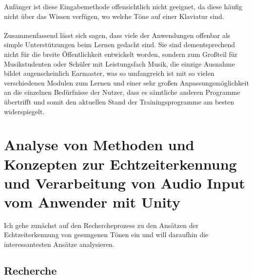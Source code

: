 Anfänger ist diese Eingabemethode offensichtlich nicht geeignet, da diese häufig nicht über das Wissen verfügen, wo welche Töne auf einer Klaviatur sind. \\\\
Zusammenfassend lässt sich sagen, dass viele der Anwendungen offenbar als simple Unterstützungen beim Lernen gedacht sind. Sie sind dementsprechend nicht für die breite Öffentlichkeit entwickelt worden, sondern zum Großteil für Musikstudenten oder Schüler mit Leistungsfach Musik, die einzige Ausnahme bildet augenscheinlich Earmaster, was so umfangreich ist mit so vielen verschiedenen Modulen zum Lernen und einer sehr großen Anpassungsmöglichkeit an die einzelnen Bedürfnisse der Nutzer, dass es sämtliche anderen Programme übertrifft und somit den aktuellen Stand der Trainingsprogramme am besten widerspiegelt. 

\section{Analyse von Methoden und Konzepten zur Echtzeiterkennung und Verarbeitung von Audio Input vom Anwender mit Unity}
Ich gehe zunächst auf den Rechercheprozess zu den Ansätzen der Echtzeiterkennung von gesungenen Tönen ein und will daraufhin die interessantesten Ansätze analysieren. 

\subsection{Recherche}

